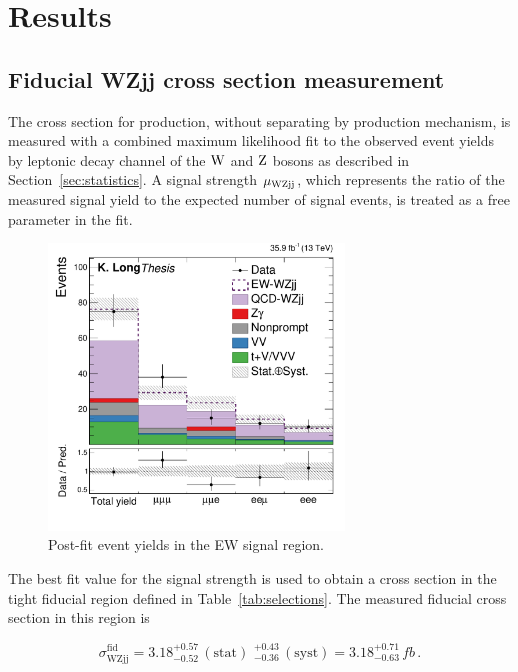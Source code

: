 \chapter{Results}

\section{Fiducial WZjj cross section measurement}

The cross section for \WZjj production, without separating by production mechanism,
is measured with a combined maximum likelihood fit to the 
observed event yields by leptonic decay channel of the $\mathrm{W}$ and $\mathrm{Z}$ bosons as 
described in Section~\ref{sec:statistics}.
A signal strength $\mu_{\rm {WZjj}}$, which represents the 
ratio of the measured signal yield to the expected number of signal events, 
is treated as a free parameter in the fit.

\begin{figure}[htbp]
  \centering
   \includegraphics[width=0.7\textwidth]{figures/AnalysisResults/yieldByChannel.pdf}
  \caption{
    Post-fit event yields in the EW signal region.
          }
 \label{fig:EWSignalYields}
\end{figure}


The best fit value for the signal strength is used to obtain a cross section
in the tight fiducial region defined in Table~\ref{tab:selections}. 
The measured fiducial \WZjj cross section in this region is

\begin{equation}
  \sigma^{\mathrm{fid}}_{\mathrm{WZjj}} = 
        3.18^{+0.57}_{-0.52} \, \mathrm{(stat)} \,\, ^{+0.43}_{-0.36} \, \mathrm{(syst)}
        = 3.18^{+0.71}_{-0.63} \,\unit{fb} \,.
\end{equation}

